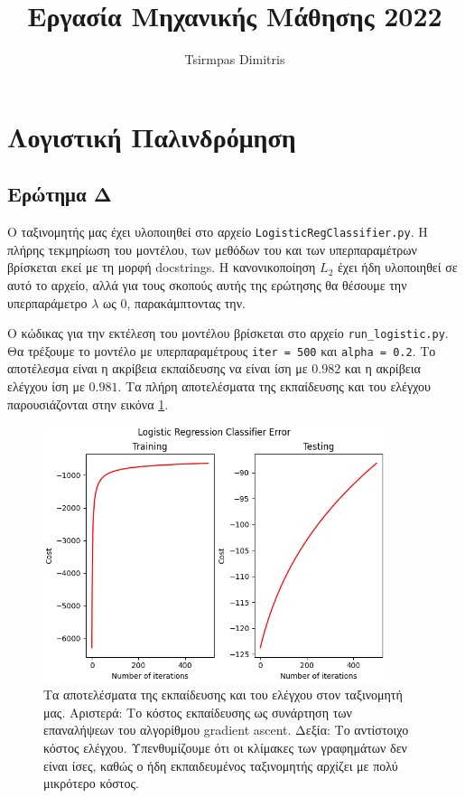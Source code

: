 \documentclass{article}
\title{Εργασία Μηχανικής Μάθησης 2022}
\author{Tsirmpas Dimitris}
\newcommand{\code}{\texttt}
\begin{document}
	
\maketitle
	
\section{Λογιστική Παλινδρόμηση}

\subsection{Ερώτημα Δ}
Ο ταξινομητής μας έχει υλοποιηθεί στο αρχείο \code{LogisticRegClassifier.py}. Η πλήρης τεκμηρίωση του μοντέλου, των μεθόδων του και των υπερπαραμέτρων βρίσκεται εκεί με τη μορφή docstrings. Η κανονικοποίηση $L_{2}$ έχει ήδη υλοποιηθεί σε αυτό το αρχείο, αλλά για τους σκοπούς αυτής της ερώτησης θα θέσουμε την υπερπαράμετρο \code{$\lambda$} ως 0, παρακάμπτοντας την.\par

Ο κώδικας για την εκτέλεση του μοντέλου βρίσκεται στο αρχείο \code{run\_logistic.py}. Θα τρέξουμε το μοντέλο με υπερπαραμέτρους \code{iter = 500} και \code{alpha = 0.2}. Το αποτέλεσμα είναι η ακρίβεια εκπαίδευσης να είναι ίση με $0.982$ και η ακρίβεια ελέγχου ίση με $0.981$. Τα πλήρη αποτελέσματα της εκπαίδευσης και του ελέγχου παρουσιάζονται στην εικόνα \ref{logistic_train_test}.

\begin{figure}
	\label{logistic_train_test}
	\includegraphics[width=10cm]{logistic_error.png}
	\centering
	\caption{Τα αποτελέσματα της εκπαίδευσης και του ελέγχου στον ταξινομητή μας. Αριστερά: Το κόστος εκπαίδευσης ως συνάρτηση των επαναλήψεων του αλγορίθμου gradient ascent. Δεξία: Το αντίστοιχο κόστος ελέγχου. Υπενθυμίζουμε ότι οι κλίμακες των γραφημάτων δεν είναι ίσες, καθώς ο ήδη εκπαιδευμένος ταξινομητής αρχίζει με πολύ μικρότερο κόστος. }
\end{figure}
\end{document}
